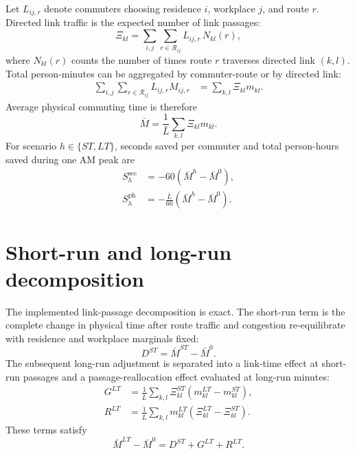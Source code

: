 \documentclass[12pt]{article}
\newcommand{\R}{\mathcal R}
\newcommand{\Lbar}{\bar L}
\begin{document}
Let $L_{ij,r}$ denote commuters choosing residence $i$, workplace $j$, and
route $r$. Directed link traffic is the expected number of link passages:
\begin{equation}
  \Xi_{kl}
  =\sum_{i,j}\sum_{r\in\R_{ij}}
  L_{ij,r}\,N_{kl}(r),
  \label{eq:link_passages}
\end{equation}
where $N_{kl}(r)$ counts the number of times route $r$ traverses directed
link $(k,l)$. Total person-minutes can be aggregated by commuter-route or by
directed link:
\begin{align}
  \sum_{i,j}\sum_{r\in\R_{ij}}L_{ij,r}M_{ij,r}
  &=\sum_{k,l}\Xi_{kl}m_{kl}.
  \label{eq:person_minutes_identity}
\end{align}
Average physical commuting time is therefore
\begin{equation}
  \bar M
  =\frac{1}{\Lbar}\sum_{k,l}\Xi_{kl}m_{kl}.
  \label{eq:average_minutes}
\end{equation}
For scenario $h\in\{ST,LT\}$, seconds saved per commuter and total
person-hours saved during one AM peak are
\begin{align}
  S_h^{\mathrm{sec}}
  &=-60\left(\bar M^h-\bar M^0\right),
  \label{eq:seconds_saved}\\
  S_h^{\mathrm{ph}}
  &=-\frac{\Lbar}{60}\left(\bar M^h-\bar M^0\right).
  \label{eq:person_hours_saved}
\end{align}

\section{Short-run and long-run decomposition}

The implemented link-passage decomposition is exact. The short-run term is
the complete change in physical time after route traffic and congestion
re-equilibrate with residence and workplace marginals fixed:
\begin{equation}
  D^{ST}=\bar M^{ST}-\bar M^0.
  \label{eq:st_change}
\end{equation}
The subsequent long-run adjustment is separated into a link-time effect at
short-run passages and a passage-reallocation effect evaluated at long-run
minutes:
\begin{align}
  G^{LT}
  &=\frac{1}{\Lbar}\sum_{k,l}
    \Xi_{kl}^{ST}\left(m_{kl}^{LT}-m_{kl}^{ST}\right),
  \label{eq:lt_network}\\
  R^{LT}
  &=\frac{1}{\Lbar}\sum_{k,l}
    m_{kl}^{LT}\left(\Xi_{kl}^{LT}-\Xi_{kl}^{ST}\right).
  \label{eq:lt_reallocation}
\end{align}
These terms satisfy
\begin{equation}
  \bar M^{LT}-\bar M^0=D^{ST}+G^{LT}+R^{LT}.
  \label{eq:decomposition_identity}
\end{equation}
\end{document}
